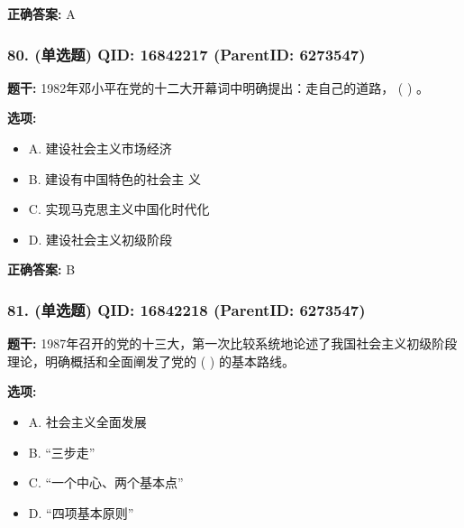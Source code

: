 \documentclass[12pt,UTF8]{ctexart}
\begin{document}
\textbf{正确答案:}
A

\vspace{0.3em}\hrulefill\vspace{0.7em}

\subsubsection*{80. (单选题) \small QID: 16842217 (ParentID: 6273547)}

\textbf{题干:}
1982年邓小平在党的十二大开幕词中明确提出：走自己的道路， ( ) 。



\textbf{选项:}
\begin{itemize}[leftmargin=*]

  \item A. 建设社会主义市场经济

  \item B. 建设有中国特色的社会主 义

  \item C. 实现马克思主义中国化时代化

  \item D. 建设社会主义初级阶段

\end{itemize}

\textbf{正确答案:}
B

\vspace{0.3em}\hrulefill\vspace{0.7em}

\subsubsection*{81. (单选题) \small QID: 16842218 (ParentID: 6273547)}

\textbf{题干:}
1987年召开的党的十三大，第一次比较系统地论述了我国社会主义初级阶段理论，明确概括和全面阐发了党的 ( ) 的基本路线。



\textbf{选项:}
\begin{itemize}[leftmargin=*]

  \item A. 社会主义全面发展

  \item B. “三步走”

  \item C. “一个中心、两个基本点”

  \item D. “四项基本原则”

\end{itemize}
\end{document}
